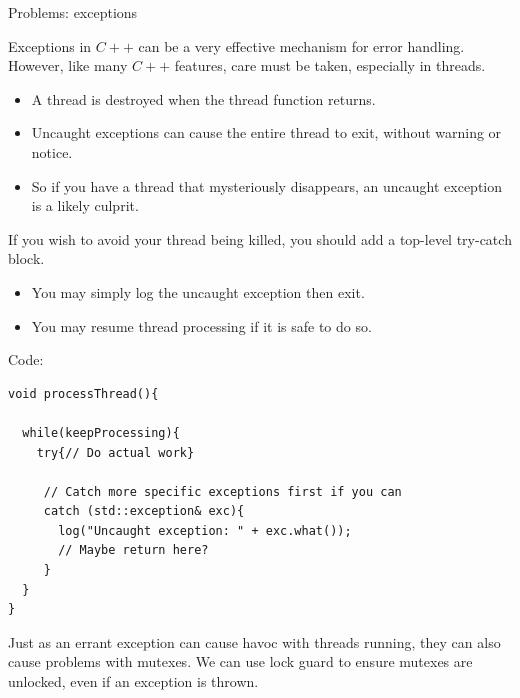 \documentclass[8pt]{beamer}
\begin{document}
\begin{frame}[fragile]{Problems: exceptions}
 
Exceptions in $C++$ can be a very effective mechanism for error handling. However, like many $C++$ features, care must be taken, especially in threads. 
\begin{itemize}
  \item A thread is destroyed when the thread function returns.
  \item Uncaught exceptions can cause the entire thread to exit, without warning or notice.
  \item So if you have a thread that mysteriously disappears, an uncaught exception is a likely culprit.
\end{itemize}

If you wish to avoid your thread being killed, you should add a top-level try-catch block.
\begin{itemize}
  \item You may simply log the uncaught exception then exit.
  \item You may resume thread processing if it is safe to do so.
\end{itemize}
 
\begin{exampleblock}{Code:}
 
\begin{lstlisting}
void processThread(){

  while(keepProcessing){
    try{// Do actual work}
        
     // Catch more specific exceptions first if you can
     catch (std::exception& exc){
       log("Uncaught exception: " + exc.what());
       // Maybe return here?
     }
  }
}
\end{lstlisting}

\end{exampleblock}

Just as an errant exception can cause havoc with threads running, they can also cause problems with mutexes. We can use lock guard to ensure mutexes are unlocked, even if an exception is thrown.
 
\end{frame}
\end{document}
